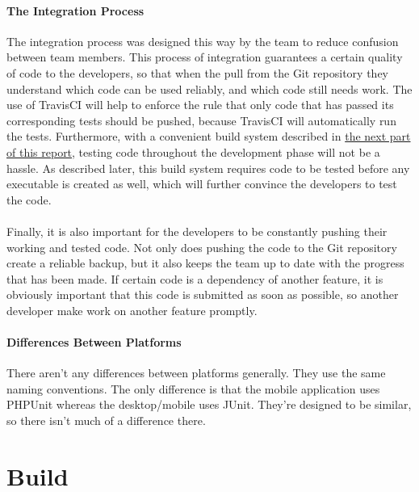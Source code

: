 \documentclass[12pt]{report}
\begin{document}
\subsection{The Integration Process}
\label{s:integrationprocessrationale}
The integration process was designed this way by the team to reduce confusion between team members.
This process of integration guarantees a certain quality of code to the developers, so that when the
pull from the Git repository they understand which code can be used reliably, and which code still
needs work. The use of TravisCI will help to enforce the rule that only code that has passed its
corresponding tests should be pushed, because TravisCI will automatically run the tests.
Furthermore, with a convenient build system described in \hyperref[p:build]{the next part of this
report}, testing code throughout the development phase will not be a hassle. As described later,
this build system requires code to be tested before any executable is created as well, which will
further convince the developers to test the code.\\\\
Finally, it is also important for the developers to be constantly pushing their working and tested
code. Not only does pushing the code to the Git repository create a reliable backup, but it also
keeps the team up to date with the progress that has been made. If certain code is a dependency of
another feature, it is obviously important that this code is submitted as soon as possible, so
another developer make work on another feature promptly.

\subsection{Differences Between Platforms}
There aren't any differences between platforms generally. They use the same naming conventions. The only difference is that the mobile application uses PHPUnit whereas the desktop/mobile uses JUnit. They're designed to be similar, so there isn't much of a difference there.

\part{Build}
\label{p:build}
\end{document}
